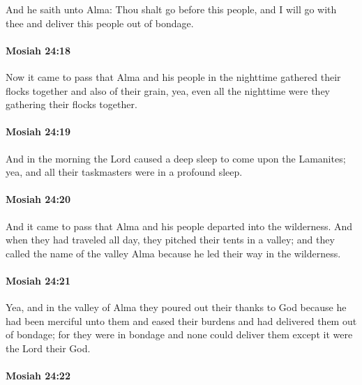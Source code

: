 			And he saith unto Alma:
			Thou shalt go before this people,
			and I will go with thee and deliver this people out of bondage.

		\paragraph{Mosiah 24:18} %
			\label{MOSIAH-24-18}

			Now it came to pass that
			Alma and his people in the nighttime gathered their flocks together
			and also of their grain,
			yea, even all the nighttime were they gathering their flocks together.

		\paragraph{Mosiah 24:19} %
			\label{MOSIAH-24-19}

			And in the morning the Lord caused a deep sleep to come upon the Lamanites;
			yea, and all their taskmasters were in a profound sleep.

		\paragraph{Mosiah 24:20} %
			\label{MOSIAH-24-20}

			And it came to pass that Alma and his people departed into the wilderness.
			And when they had traveled all day, they pitched their tents in a valley;
			and they called the name of the valley Alma
			because he led their way in the wilderness.

		\paragraph{Mosiah 24:21} %
			\label{MOSIAH-24-21}

			Yea, and in the valley of Alma they poured out their thanks to God
			because he had been merciful unto them
			and eased their burdens and had delivered them out of bondage;
			for they were in bondage and none could deliver them
			except it were the Lord their God.

		\paragraph{Mosiah 24:22} %
			\label{MOSIAH-24-22}

